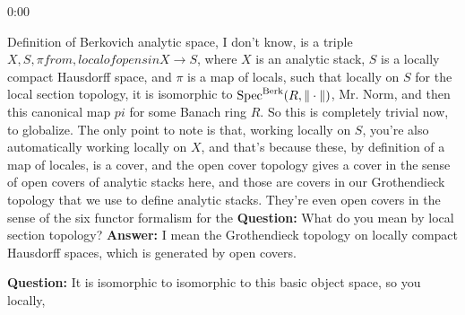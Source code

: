 \begin{unfinished}{0:00}
{Definition of Berkovich analytic space, I don't know, is a triple $X, S, \pi from, local of opens in X \to S$, where $X$ is an analytic stack, $S$ is a locally compact Hausdorff space, and $\pi$ is a map of locals, such that locally on $S$ for the local section topology, it is isomorphic to $\operatorname{Spec}^{\mathrm{Berk}} (R, \| \cdot \|)$, Mr. Norm, and then this canonical map $pi$ for some Banach ring $R$. 
So this is completely trivial now, to globalize. The only point to note is that, working locally on $S$, you're also automatically working locally on $X$, and that's because these, by definition of a map of locales, is a cover, and the open cover topology gives a cover in the sense of open covers of analytic stacks here, and those are covers in our Grothendieck topology that we use to define analytic stacks.
They're even open covers in the sense of the six functor formalism for the 
\textbf{Question:} What do you mean by local section topology?
\textbf{Answer:} I mean the Grothendieck topology on locally compact Hausdorff spaces, which is generated by open covers.

\textbf{Question:} It is isomorphic to isomorphic to this basic object space, so you locally, 

}
\end{unfinished}
